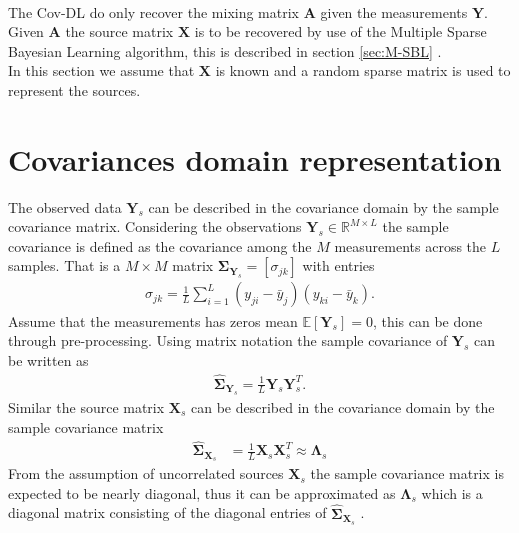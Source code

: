\\
The Cov-DL do only recover the mixing matrix $\mathbf{A}$ given the measurements $\textbf{Y}$. Given $\textbf{A}$ the source matrix $\mathbf{X}$ is to be recovered by use of the Multiple Sparse Bayesian Learning algorithm, this is described in section \ref{sec:M-SBL} . 
\\
In this section we assume that $\mathbf{X}$ is known and a random sparse matrix is used to represent the sources. 


\section{Covariances domain representation}
The observed data $\mathbf{Y}_s$ can be described in the covariance domain by the sample covariance matrix. Considering the observations $\mathbf{Y}_s \in \mathbb{R}^{M\times L}$ the sample covariance is defined as the covariance among the $M$ measurements across the $L$ samples. That is a $M \times M$ matrix $\boldsymbol{\Sigma}_{\mathbf{Y}_s}=[\sigma_{jk}]$ with entries 
\begin{align*}
\sigma_{jk}= \frac{1}{L}\sum_{i=1}^{L}(y_{ji}- \bar{y}_j)(y_{ki}-\bar{y}_k).
\end{align*}
Assume that the measurements has zeros mean $\mathbb{E}[\mathbf{Y}_s] = 0$, this can be done through pre-processing. 
Using matrix notation the sample covariance of $\mathbf{Y}_s$ can be written as
\begin{align*}
\hat{\boldsymbol{\Sigma}}_{\mathbf{Y}_s} = \frac{1}{L} \mathbf{Y}_s \mathbf{Y}_s^T.
\end{align*}  
Similar the source matrix $\mathbf{X}_s$ can be described in the covariance domain by the sample covariance matrix
\begin{align*}
\hat{\boldsymbol{\Sigma}}_{\mathbf{X}_s} &= \frac{1}{L} \mathbf{X}_s \mathbf{X}_s^T \approx \boldsymbol{\Lambda}_s
\end{align*}
From the assumption of uncorrelated sources $\mathbf{X}_s$ the sample covariance matrix is expected to be nearly diagonal, thus it can be approximated as $\boldsymbol{\Lambda}_s$ which is a diagonal matrix consisting of the diagonal entries of $\hat{\boldsymbol{\Sigma}}_{\mathbf{X}_s}$ \cite{Balkan2015}.
